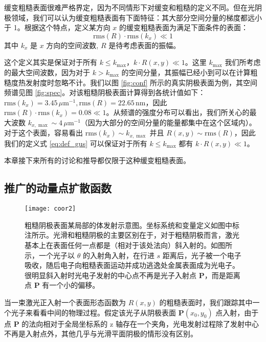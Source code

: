 缓变粗糙表面很难严格界定，因为不同情形下对缓变和粗糙的定义不同。但在光阴极领域，我们可以认为缓变粗糙表面有下面特征：其大部分空间分量的梯度都远小于 1。根据这个特点，定义某方向 $x$ 的缓变粗糙表面为满足下面条件的表面：
\begin{equation}
\text{rms}(R)\cdot\text{rms}(k_x) \ll 1
\label{eq:def_gus}
\end{equation}
其中 $k_x$ 是 $x$ 方向的空间波数, $R$ 是待考虑表面的振幅。 

这个定义其实是保证对于所有 $k \le k_{\max}$，$k\cdot R(x, y) \ll 1$。这里 $k_{\max}$ 我们所考虑的最大空间波数，因为对于 $k > k_{\max}$ 的空间分量，其振幅已经小到可以在计算粗糙度热发射度时忽略不计。我们以图 \ref{fig:conf} 所示的真实阴极表面为例，其空间频谱见图 \ref{fig:spec}。对该粗糙阴极表面计算得到各统计值如下：$\text{rms}(k_x)=3.45\,\mu\text{m}^{-1}, \text{rms}(R)=22.65\,\text{nm}$，因此 $\text{rms}(R)\cdot\text{rms}(k_x) = 0.08 \ll 1$。从频谱的强度分布可以看出，我们所关心的最大波数 $k_{x, \max}\sim 4\,\mu\text{m}^{-1}$（因为大部分的空间分量的能量都集中在这个区域内）。对于这个表面，容易看出 $\text{rms}(k_x)\sim k_{x, \max}$ 并且 $R(x, y)\sim\text{rms}(R)$，因此我们的定义式 \ref{eq:def_gus} 可以保证对于所有 $k \le k_{\max}$ 都有 $k\cdot R(x, y) \ll 1$。

本章接下来所有的讨论和推导都仅限于这种缓变粗糙表面。

\subsection{\label{ss:gmpsf}推广的动量点扩散函数}

\begin{figure}[htbp]
\centering
\texttt{[image: coor2]}
\caption{\label{fig:coor_m} 粗糙阴极表面某局部的体发射示意图。坐标系统和变量定义如图中标注所示。光滑和粗糙阴极的主要区别在于，对于粗糙阴极而言，激光基本上在表面任何一点都是（相对于该处法向）斜入射的。如图所示，一个光子以 $\theta$ 的入射角入射，在行进 $s$ 距离后，光子被一个电子吸收，随后电子向粗糙表面运动并成功逃逸处金属表面成为光电子。很明显斜入射时光电子发射的中心点不再是光子入射点 \textbf{P}，而是距离点 \textbf{P} 有一个小的偏移。}
\end{figure}

当一束激光正入射一个表面形态函数为 $R(x, y)$ 的粗糙表面时，我们跟踪其中一个光子来看看中间的物理过程。假定该光子从阴极表面 \textbf{P}$(x_0, y_0)$ 点入射，由于点 \textbf{P} 的法向相对于全局坐标系的 z 轴存在一个夹角，光电发射过程除了发射中心不再是入射点外，其他几乎与光滑平面阴极的情形没有区别。

